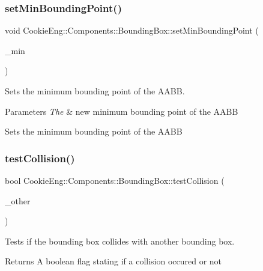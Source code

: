 \subsubsection{\texorpdfstring{set\+Min\+Bounding\+Point()}{setMinBoundingPoint()}}
{\footnotesize\ttfamily void Cookie\+Eng\+::\+Components\+::\+Bounding\+Box\+::set\+Min\+Bounding\+Point (\begin{DoxyParamCaption}\item[{const glm\+::vec3 \&}]{\+\_\+min }\end{DoxyParamCaption})\hspace{0.3cm}{\ttfamily [inline]}}



Sets the minimum bounding point of the A\+A\+BB. 


\begin{DoxyParams}{Parameters}
{\em The} & new minimum bounding point of the A\+A\+BB\\
\hline
\end{DoxyParams}
Sets the minimum bounding point of the A\+A\+BB \mbox{\label{class_cookie_eng_1_1_components_1_1_bounding_box_aa121d65a4271d524fefb153f7388421a}} 
\subsubsection{\texorpdfstring{test\+Collision()}{testCollision()}\hspace{0.1cm}{\footnotesize\ttfamily [1/2]}}
{\footnotesize\ttfamily bool Cookie\+Eng\+::\+Components\+::\+Bounding\+Box\+::test\+Collision (\begin{DoxyParamCaption}\item[{const \hyperlink{class_cookie_eng_1_1_components_1_1_bounding_box}{Bounding\+Box} \&}]{\+\_\+other }\end{DoxyParamCaption})}



Tests if the bounding box collides with another bounding box. 

\begin{DoxyReturn}{Returns}
A boolean flag stating if a collision occured or not 
\end{DoxyReturn}

